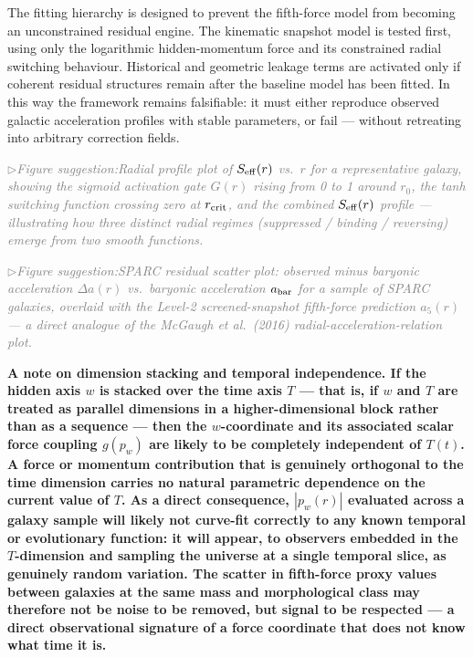 \documentclass[11pt,a4paper]{article}
\newcommand{\pw}{p_w}                        %
\newcommand{\afiver}{a_5}                    %
\newcommand{\Seff}{S_{\rm eff}}              %
\newcommand{\figsuggest}[1]{%
  \medskip
  \noindent\hspace{0pt}\textcolor{gray}{\small\itshape
    $\triangleright$\;Figure suggestion:\enspace #1}%
  \medskip}
\begin{document}
\noindent
The fitting hierarchy is designed to prevent the fifth-force model from
becoming an unconstrained residual engine.  The kinematic snapshot model
is tested first, using only the logarithmic hidden-momentum force and its
constrained radial switching behaviour.  Historical and geometric leakage
terms are activated only if coherent residual structures remain after the
baseline model has been fitted.  In this way the framework remains falsifiable:
it must either reproduce observed galactic acceleration profiles with stable
parameters, or fail --- without retreating into arbitrary correction fields.

\figsuggest{Radial profile plot of $\Seff(r)$ vs.\ $r$ for a representative
galaxy, showing the sigmoid activation gate $G(r)$ rising from 0 to 1 around
$r_0$, the tanh switching function crossing zero at $r_{\rm crit}$, and the
combined $\Seff(r)$ profile --- illustrating how three distinct radial regimes
(suppressed / binding / reversing) emerge from two smooth functions.}

\figsuggest{SPARC residual scatter plot: observed minus baryonic acceleration
$\Delta a(r)$ vs.\ baryonic acceleration $a_{\rm bar}$ for a sample of SPARC
galaxies, overlaid with the Level-2 screened-snapshot fifth-force prediction
$\afiver(r)$ --- a direct analogue of the McGaugh et al.\ (2016)
radial-acceleration-relation plot.}

\medskip
\noindent\textbf{A note on dimension stacking and temporal independence.
If the hidden axis $w$ is stacked over the time axis $T$ --- that is, if
$w$ and $T$ are treated as parallel dimensions in a higher-dimensional
block rather than as a sequence --- then the $w$-coordinate and its
associated scalar force coupling $g(\pw)$ are likely to be completely
independent of $T(t)$.  A force or momentum contribution that is genuinely
orthogonal to the time dimension carries no natural parametric dependence
on the current value of $T$.  As a direct consequence, $|\pw(r)|$ evaluated
across a galaxy sample will likely not curve-fit correctly to any known
temporal or evolutionary function: it will appear, to observers embedded in
the $T$-dimension and sampling the universe at a single temporal slice, as
genuinely random variation.  The scatter in fifth-force proxy values between
galaxies at the same mass and morphological class may therefore not be noise
to be removed, but signal to be respected --- a direct observational signature
of a force coordinate that does not know what time it is.}

\medskip
\end{document}
